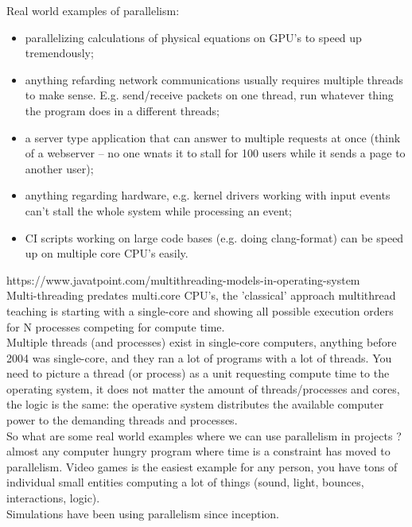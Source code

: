 \documentclass[11pt, a4paper, oneside]{article}
\theoremstyle{definition}
\begin{document}
Real world examples of parallelism:\\
\begin{itemize}
	\item parallelizing calculations of physical equations on GPU's to speed up tremendously;
	\item anything refarding network communications usually requires multiple threads to make sense. E.g. send/receive packets on one thread, run whatever thing the program does in a different threads;
	\item a server type application that can answer to multiple requests at once (think of a webserver -- no one wnats it to stall for 100 users while it sends a page to another user);
	\item anything regarding hardware, e.g. kernel drivers working with input events can't stall the whole system while processing an event;
	\item CI scripts working on large code bases (e.g. doing clang-format) can be speed up on multiple core CPU's easily.
\end{itemize}

https://www.javatpoint.com/multithreading-models-in-operating-system\\
Multi-threading predates multi.core CPU's, the 'classical' approach multithread teaching is starting with a single-core and showing all possible execution orders for N processes competing for compute time.\\
Multiple threads (and processes) exist in single-core computers, anything before 2004 was single-core, and they ran a lot of programs with a lot of threads. You need to picture a thread (or process) as a unit requesting compute time to the operating system, it does not matter the amount of threads/processes and cores, the logic is the same: the operative system distributes the available computer power to the demanding threads and processes.\\

So what are some real world examples where we can use parallelism in projects ?\\
almost any computer hungry program where time is a constraint has moved to parallelism. Video games is the easiest example for any person, you have tons of individual small entities computing a lot of things (sound, light, bounces, interactions, logic).\\
Simulations have been using parallelism since inception.\\
\end{document}
